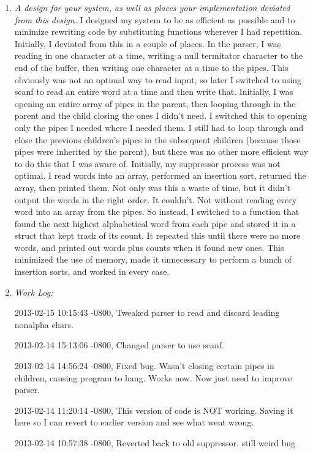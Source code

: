 \documentclass[letterpaper,10pt,titlepage]{article}
\begin{document}
\begin{enumerate}
\item \emph{A design for your system, as well as places your implementation deviated from this design.}
I designed my system to be as efficient as possible and to minimize rewriting code by substituting functions wherever I had repetition. Initially, I deviated from this in a couple of places. In the parser, I was reading in one character at a time, writing a null termitator character to the end of the buffer, then writing one character at a time to the pipes. This obviously was not an optimal way to read input, so later I switched to using scanf to read an entire word at a time and then write that. Initially, I was opening an entire array of pipes in the parent, then looping through in the parent and the child closing the ones I didn't need. I switched this to opening only the pipes I needed where I needed them. I still had to loop through and close the previous children's pipes in the subsequent children (because those pipes were inherited by the parent), but there was no other more efficient way to do this that I was aware of. Initially, my suppressor process was not optimal. I read words into an array, performed an insertion sort, returned the array, then printed them. Not only was this a waste of time, but it didn't output the words in the right order. It couldn't. Not without reading every word into an array from the pipes. So instead, I switched to a function that found the next highest alphabetical word from each pipe and stored it in a struct that kept track of its count. It repeated this until there were no more words, and printed out words plus counts when it found new ones. This minimized the use of memory, made it unnecessary to perform a bunch of insertion sorts, and worked in every case. 

\item \emph{Work Log:}

2013-02-15 10:15:43 -0800, Tweaked parser to read and discard leading nonalpha chars.

2013-02-14 15:13:06 -0800, Changed parser to use scanf.

2013-02-14 14:56:24 -0800, Fixed bug. Wasn't closing certain pipes in children, causing program to hang. Works now. Now just need to improve parser.

2013-02-14 11:20:14 -0800, This version of code is NOT working. Saving it here so I can revert to earlier version and see what went wrong.

2013-02-14 10:57:38 -0800, Reverted back to old suppressor. still weird bug


\end{enumerate}
\end{document}
